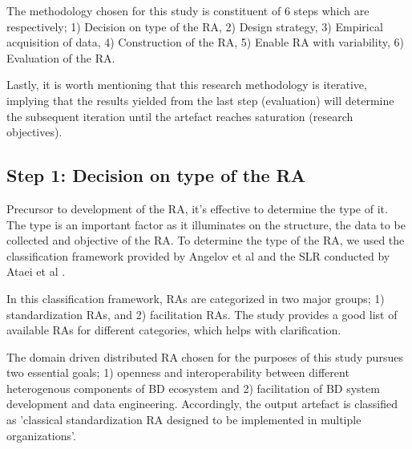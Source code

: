\documentclass[runningheads]{llncs}
\begin{document}
The methodology chosen for this study is constituent of 6 steps which are respectively; 1) Decision on type of the RA, 2) Design strategy, 3) Empirical acquisition of data, 4) Construction of the RA, 5) Enable RA with variability, 6) Evaluation of the RA. 


Lastly, it is worth mentioning that this research methodology is iterative, implying that the results yielded from the last step (evaluation) will determine the subsequent iteration until the artefact reaches saturation (research objectives).

\subsection{Step 1: Decision on type of the RA}
Precursor to development of the RA, it's effective to determine the type of it. The type is an important factor as it illuminates on the structure, the data to be collected and objective of the RA. To determine the type of the RA, we used the classification framework provided by Angelov et al \cite{angelov2009classification} and the SLR conducted by Ataei et al \cite{AtaeiACIS}. 


In this classification framework, RAs are categorized in two major groups; 1) standardization RAs, and 2) facilitation RAs. The study provides a good list of available RAs for different categories, which helps with clarification. 

The domain driven distributed RA chosen for the purposes of this study pursues two essential goals; 1) openness and interoperability between different heterogenous components of BD ecosystem and 2) facilitation of BD system development and data engineering. Accordingly, the output artefact is classified as 'classical standardization RA designed to be implemented in multiple organizations'. 
\end{document}
